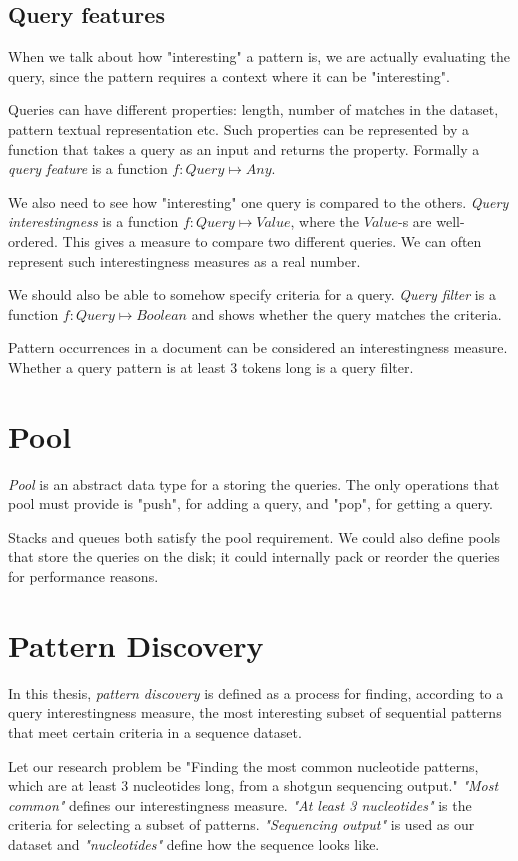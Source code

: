 \subsection{Query features}

When we talk about how "interesting" a pattern is, we are actually evaluating the query, since the pattern requires a context where it can be "interesting".

Queries can have different properties: length, number of matches in the dataset, pattern textual representation etc. Such properties can be represented by a function that takes a query as an input and returns the property. Formally a \emph{query feature} is a function $f: Query \mapsto Any$.

We also need to see how "interesting" one query is compared to the others. \emph{Query interestingness} is a function $f: Query \mapsto Value$, where the $Value$-s are well-ordered. This gives a measure to compare two different queries. We can often represent such interestingness measures as a real number.

We should also be able to somehow specify criteria for a query. \emph{Query filter} is a function $f: Query \mapsto Boolean$ and shows whether the query matches the criteria.

\begin{exmp}
Pattern occurrences in a document can be considered an interestingness measure. Whether a query pattern is at least 3 tokens long is a query filter.
\end{exmp}

\section{Pool}

\emph{Pool} is an abstract data type for a storing the queries. The only operations that pool must provide is "push", for adding a query, and "pop", for getting a query.

\begin{exmp}
Stacks and queues both satisfy the pool requirement. We could also define pools that store the queries on the disk; it could internally pack or reorder the queries for performance reasons.
\end{exmp}

\section{Pattern Discovery}

In this thesis, \emph{pattern discovery} is defined as a process for finding, according to a query interestingness measure, the most interesting subset of sequential patterns that meet certain criteria in a sequence dataset.

\begin{exmp}
Let our research problem be "Finding the most common nucleotide patterns, which are at least 3 nucleotides long, from a shotgun sequencing output." \emph{"Most common"} defines our interestingness measure. \emph{"At least 3 nucleotides"} is the criteria for selecting a subset of patterns. \emph{"Sequencing output"} is used as our dataset and \emph{"nucleotides"} define how the sequence looks like.
\end{exmp}